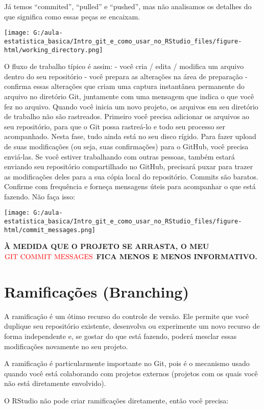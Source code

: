 \documentclass[]{book}
\begin{document}
Já temos ``commited'', ``pulled'' e ``pushed'', mas não analisamos os detalhes do que significa como essas peças se encaixam.

\texttt{[image: G:/aula-estatistica\_basica/Intro\_git\_e\_como\_usar\_no\_RStudio\_files/figure-html/working\_directory.png]}

O fluxo de trabalho típico é assim: - você cria / edita / modifica um arquivo dentro do seu repositório - você prepara as alterações na área de preparação - confirma essas alterações que criam uma captura instantânea permanente do arquivo no diretório Git, juntamente com uma mensagem que indica o que você fez no arquivo.
Quando você inicia um novo projeto, os arquivos em seu diretório de trabalho não são rastreados. Primeiro você precisa adicionar os arquivos ao seu repositório, para que o Git possa rastreá-lo e todo seu processo ser acompanhado.
Nesta fase, tudo ainda está no seu disco rígido. Para fazer upload de suas modificações (ou seja, suas confirmações) para o GitHub, você precisa enviá-las.
Se você estiver trabalhando com outras pessoas, também estará enviando seu repositório compartilhado no GitHub, precisará puxar para trazer as modificações deles para a sua cópia local do repositório.
Commits são baratos. Confirme com frequência e forneça mensagens úteis para acompanhar o que está fazendo. Não faça isso:

\texttt{[image: G:/aula-estatistica\_basica/Intro\_git\_e\_como\_usar\_no\_RStudio\_files/figure-html/commit\_messages.png]}

\textbf{À MEDIDA QUE O PROJETO SE ARRASTA, O MEU \(\color{red}{\text{GIT COMMIT MESSAGES}}\) FICA MENOS E MENOS INFORMATIVO.}

\hypertarget{ramificacoes-branching}{%
\section{Ramificações (Branching)}\label{ramificacoes-branching}}

A ramificação é um ótimo recurso do controle de versão. Ele permite que você duplique seu repositório existente, desenvolva ou experimente um novo recurso de forma independente e, se gostar do que está fazendo, poderá mesclar essas modificações novamente no seu projeto.

A ramificação é particularmente importante no Git, pois é o mecanismo usado quando você está colaborando com projetos externos (projetos com os quais você não está diretamente envolvido).

O RStudio não pode criar ramificações diretamente, então você precisa:
\end{document}
